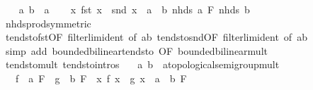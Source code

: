 \begin{isabellebody}
%
\isadelimproof
%
\endisadelimproof
%
\isatagproof
{}\isamarkupfalse%
\isanewline
\ \ \isamarkupfalse%
\ a\ b\ {\isacharcolon}{\kern0pt}{\isacharcolon}{\kern0pt}\ {\isacharprime}{\kern0pt}a\isanewline
\ \ \isamarkupfalse%
\ {\isachardoublequoteopen}{\isacharparenleft}{\kern0pt}{\isacharparenleft}{\kern0pt}{\isasymlambda}x{\isachardot}{\kern0pt}\ fst\ x\ {\isacharasterisk}{\kern0pt}\ snd\ x{\isacharparenright}{\kern0pt}\ {\isasymlonglongrightarrow}\ a\ {\isacharasterisk}{\kern0pt}\ b{\isacharparenright}{\kern0pt}\ {\isacharparenleft}{\kern0pt}nhds\ a\ {\isasymtimes}\isactrlsub F\ nhds\ b{\isacharparenright}{\kern0pt}{\isachardoublequoteclose}\isanewline
\ \ \ \ \isamarkupfalse%
\ nhds{\isacharunderscore}{\kern0pt}prod{\isacharbrackleft}{\kern0pt}symmetric{\isacharbrackright}{\kern0pt}\isanewline
\ \ \ \ \isamarkupfalse%
\ tendsto{\isacharunderscore}{\kern0pt}fst{\isacharbrackleft}{\kern0pt}OF\ filterlim{\isacharunderscore}{\kern0pt}ident{\isacharcomma}{\kern0pt}\ of\ {\isachardoublequoteopen}{\isacharparenleft}{\kern0pt}a{\isacharcomma}{\kern0pt}b{\isacharparenright}{\kern0pt}{\isachardoublequoteclose}{\isacharbrackright}{\kern0pt}\ tendsto{\isacharunderscore}{\kern0pt}snd{\isacharbrackleft}{\kern0pt}OF\ filterlim{\isacharunderscore}{\kern0pt}ident{\isacharcomma}{\kern0pt}\ of\ {\isachardoublequoteopen}{\isacharparenleft}{\kern0pt}a{\isacharcomma}{\kern0pt}b{\isacharparenright}{\kern0pt}{\isachardoublequoteclose}{\isacharbrackright}{\kern0pt}\isanewline
\ \ \ \ \isamarkupfalse%
\ {\isacharparenleft}{\kern0pt}simp\ add{\isacharcolon}{\kern0pt}\ bounded{\isacharunderscore}{\kern0pt}bilinear{\isachardot}{\kern0pt}tendsto\ {\isacharbrackleft}{\kern0pt}OF\ bounded{\isacharunderscore}{\kern0pt}bilinear{\isacharunderscore}{\kern0pt}mult{\isacharbrackright}{\kern0pt}{\isacharparenright}{\kern0pt}\isanewline
{}\isamarkupfalse%
%
\endisatagproof
{\isafoldproof}%
%
\isadelimproof
\isanewline
%
\endisadelimproof
\isanewline
{}\isamarkupfalse%
\ tendsto{\isacharunderscore}{\kern0pt}mult\ {\isacharbrackleft}{\kern0pt}tendsto{\isacharunderscore}{\kern0pt}intros{\isacharbrackright}{\kern0pt}{\isacharcolon}{\kern0pt}\isanewline
\ \ \ a\ b\ {\isacharcolon}{\kern0pt}{\isacharcolon}{\kern0pt}\ {\isachardoublequoteopen}{\isacharprime}{\kern0pt}a{\isacharcolon}{\kern0pt}{\isacharcolon}{\kern0pt}topological{\isacharunderscore}{\kern0pt}semigroup{\isacharunderscore}{\kern0pt}mult{\isachardoublequoteclose}\isanewline
\ \ \ {\isachardoublequoteopen}{\isacharparenleft}{\kern0pt}f\ {\isasymlonglongrightarrow}\ a{\isacharparenright}{\kern0pt}\ F\ {\isasymLongrightarrow}\ {\isacharparenleft}{\kern0pt}g\ {\isasymlonglongrightarrow}\ b{\isacharparenright}{\kern0pt}\ F\ {\isasymLongrightarrow}\ {\isacharparenleft}{\kern0pt}{\isacharparenleft}{\kern0pt}{\isasymlambda}x{\isachardot}{\kern0pt}\ f\ x\ {\isacharasterisk}{\kern0pt}\ g\ x{\isacharparenright}{\kern0pt}\ {\isasymlonglongrightarrow}\ a\ {\isacharasterisk}{\kern0pt}\ b{\isacharparenright}{\kern0pt}\ F{\isachardoublequoteclose}\isanewline

\end{isabellebody}
